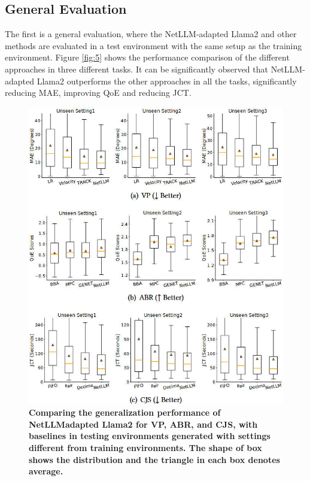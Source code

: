 \documentclass[twocolumn]{article}
\begin{document}
\subsection{General Evaluation}
The first is a general evaluation, where the NetLLM-adapted Llama2 and other methods are evaluated in a test environment with the same setup as the training environment. Figure \ref{fig:5} shows the performance comparison of the different approaches in three different tasks. It can be significantly observed that NetLLM-adapted Llama2 outperforms the other approaches in all the tasks, significantly reducing MAE, improving QoE and reducing JCT.

\begin{figure}[t]
  \centering
  \includegraphics[width=1\linewidth]{img/figure6.jpg}
  \caption{\textbf{Comparing the generalization performance of NetLLMadapted Llama2 for VP, ABR, and CJS, with baselines in testing environments generated with settings different from training environments. The shape of box shows the distribution and the triangle in each box denotes average.}}
  \label{fig:6}
\end{figure}
\end{document}
